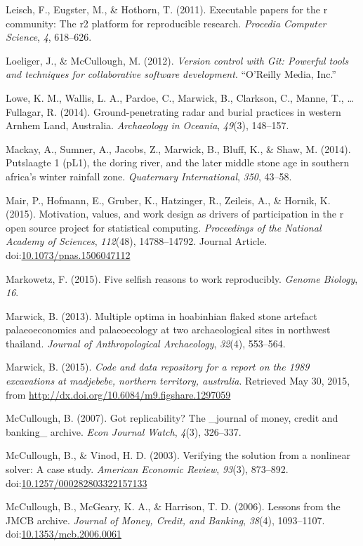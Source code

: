 \documentclass[american,man]{apa6}
\begin{document}
Leisch, F., Eugster, M., \& Hothorn, T. (2011). Executable papers for
the r community: The r2 platform for reproducible research.
\emph{Procedia Computer Science}, \emph{4}, 618--626.

Loeliger, J., \& {McCullough}, M. (2012). \emph{Version control with
Git: Powerful tools and techniques for collaborative software
development}. ``O'Reilly Media, Inc.''

Lowe, K. M., Wallis, L. A., Pardoe, C., Marwick, B., Clarkson, C.,
Manne, T., \ldots{} Fullagar, R. (2014). Ground-penetrating radar and
burial practices in western Arnhem Land, Australia. \emph{Archaeology in
Oceania}, \emph{49}(3), 148--157.

Mackay, A., Sumner, A., Jacobs, Z., Marwick, B., Bluff, K., \& Shaw, M.
(2014). Putslaagte 1 (pL1), the doring river, and the later middle stone
age in southern africa's winter rainfall zone. \emph{Quaternary
International}, \emph{350}, 43--58.

Mair, P., Hofmann, E., Gruber, K., Hatzinger, R., Zeileis, A., \&
Hornik, K. (2015). Motivation, values, and work design as drivers of
participation in the r open source project for statistical computing.
\emph{Proceedings of the National Academy of Sciences}, \emph{112}(48),
14788--14792. Journal Article.
doi:\href{http://dx.doi.org/10.1073/pnas.1506047112}{10.1073/pnas.1506047112}

Markowetz, F. (2015). Five selfish reasons to work reproducibly.
\emph{Genome Biology}, \emph{16}.

Marwick, B. (2013). Multiple optima in hoabinhian flaked stone artefact
palaeoeconomics and palaeoecology at two archaeological sites in
northwest thailand. \emph{Journal of Anthropological Archaeology},
\emph{32}(4), 553--564.

Marwick, B. (2015). \emph{Code and data repository for a report on the
1989 excavations at madjebebe, northern territory, australia}. Retrieved
May 30, 2015, from \url{http://dx.doi.org/10.6084/m9.figshare.1297059}

{McCullough}, B. (2007). Got replicability? The \_journal of money,
credit and banking\_ archive. \emph{Econ Journal Watch}, \emph{4}(3),
326--337.

{McCullough}, B., \& Vinod, H. D. (2003). Verifying the solution from a
nonlinear solver: A case study. \emph{American Economic Review},
\emph{93}(3), 873--892.
doi:\href{http://dx.doi.org/10.1257/000282803322157133}{10.1257/000282803322157133}

{McCullough}, B., {McGeary}, K. A., \& Harrison, T. D. (2006). Lessons
from the JMCB archive. \emph{Journal of Money, Credit, and Banking},
\emph{38}(4), 1093--1107.
doi:\href{http://dx.doi.org/10.1353/mcb.2006.0061}{10.1353/mcb.2006.0061}
\end{document}
